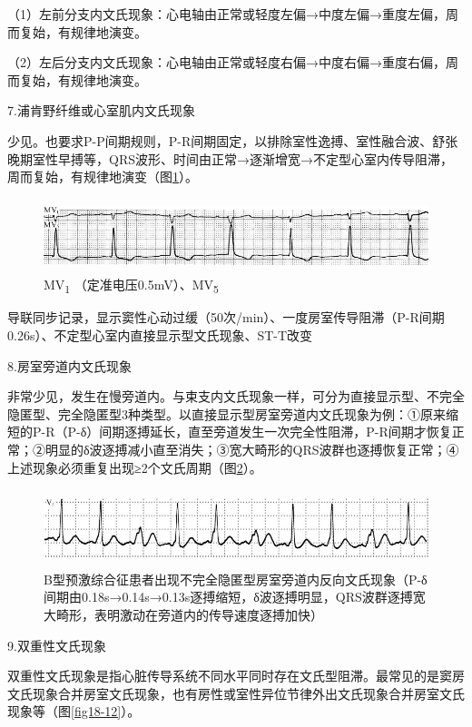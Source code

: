 （1）左前分支内文氏现象：心电轴由正常或轻度左偏→中度左偏→重度左偏，周而复始，有规律地演变。

（2）左后分支内文氏现象：心电轴由正常或轻度右偏→中度右偏→重度右偏，周而复始，有规律地演变。

7.浦肯野纤维或心室肌内文氏现象

少见。也要求P-P间期规则，P-R间期固定，以排除室性逸搏、室性融合波、舒张晚期室性早搏等，QRS波形、时间由正常→逐渐增宽→不定型心室内传导阻滞，周而复始，有规律地演变（图\ref{fig18-10}）。

\begin{figure}[!htbp]
 \centering
 \includegraphics[width=5.58333in,height=0.84375in]{./images/Image00311.jpg}
 \captionsetup{justification=centering}
 \caption{MV\textsubscript{1} （定准电压0.5mV）、MV\textsubscript{5}}
 \label{fig18-10}
  \end{figure} 
导联同步记录，显示窦性心动过缓（50次/min）、一度房室传导阻滞（P-R间期0.26s）、不定型心室内直接显示型文氏现象、ST-T改变

8.房室旁道内文氏现象

非常少见，发生在慢旁道内。与束支内文氏现象一样，可分为直接显示型、不完全隐匿型、完全隐匿型3种类型。以直接显示型房室旁道内文氏现象为例：①原来缩短的P-R（P-δ）间期逐搏延长，直至旁道发生一次完全性阻滞，P-R间期才恢复正常；②明显的δ波逐搏减小直至消失；③宽大畸形的QRS波群也逐搏恢复正常；④上述现象必须重复出现≥2个文氏周期（图\ref{fig18-11}）。

\begin{figure}[!htbp]
 \centering
 \includegraphics[width=5.625in,height=0.88542in]{./images/Image00312.jpg}
 \captionsetup{justification=centering}
 \caption{B型预激综合征患者出现不完全隐匿型房室旁道内反向文氏现象（P-δ间期由0.18s→0.14s→0.13s逐搏缩短，δ波逐搏明显，QRS波群逐搏宽大畸形，表明激动在旁道内的传导速度逐搏加快）}
 \label{fig18-11}
  \end{figure} 

9.双重性文氏现象

双重性文氏现象是指心脏传导系统不同水平同时存在文氏型阻滞。最常见的是窦房文氏现象合并房室文氏现象，也有房性或室性异位节律外出文氏现象合并房室文氏现象等（图\ref{fig18-12}）。

